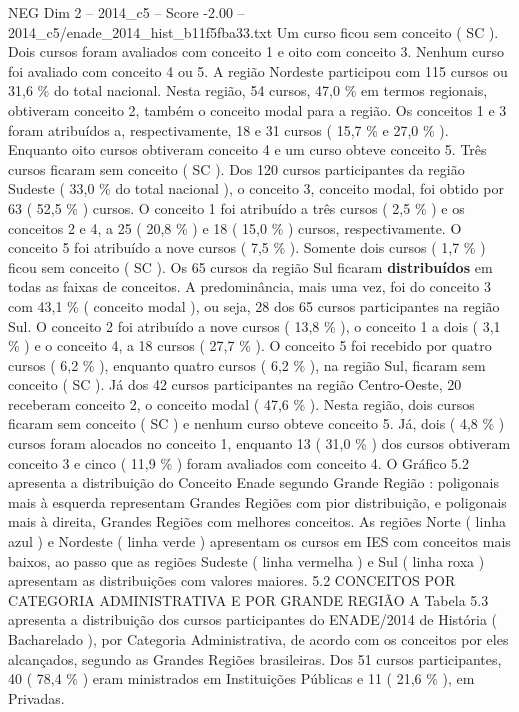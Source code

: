 \begin{textsample}{NEG Dim 2 – 2014\_c5 – Score -2.00 – 2014\_c5/enade\_2014\_hist\_b11f5fba33.txt}
Um curso ficou sem conceito ( SC ).
Dois cursos foram avaliados com conceito 1 e oito com conceito 3.
Nenhum curso foi avaliado com conceito 4 ou 5.
A região Nordeste participou com 115 cursos ou 31,6 \% do total nacional.
Nesta região, 54 cursos, 47,0 \% em termos regionais, obtiveram conceito 2, também o conceito modal para a região.
Os conceitos 1 e 3 foram atribuídos a, respectivamente, 18 e 31 cursos ( 15,7 \% e 27,0 \% ).
Enquanto oito cursos obtiveram conceito 4 e um curso obteve conceito 5.
Três cursos ficaram sem conceito ( SC ).
Dos 120 cursos participantes da região Sudeste ( 33,0 \% do total nacional ), o conceito 3, conceito modal, foi obtido por 63 ( 52,5 \% ) cursos.
O conceito 1 foi atribuído a três cursos ( 2,5 \% ) e os conceitos 2 e 4, a 25 ( 20,8 \% ) e 18 ( 15,0 \% ) cursos, respectivamente.
O conceito 5 foi atribuído a nove cursos ( 7,5 \% ).
Somente dois cursos ( 1,7 \% ) ficou sem conceito ( SC ).
Os 65 cursos da região Sul ficaram \textbf{distribuídos} em todas as faixas de conceitos.
A predominância, mais uma vez, foi do conceito 3 com 43,1 \% ( conceito modal ), ou seja, 28 dos 65 cursos participantes na região Sul.
O conceito 2 foi atribuído a nove cursos ( 13,8 \% ), o conceito 1 a dois ( 3,1 \% ) e o conceito 4, a 18 cursos ( 27,7 \% ).
O conceito 5 foi recebido por quatro cursos ( 6,2 \% ), enquanto quatro cursos ( 6,2 \% ), na região Sul, ficaram sem conceito ( SC ).
Já dos 42 cursos participantes na região Centro-Oeste, 20 receberam conceito 2, o conceito modal ( 47,6 \% ).
Nesta região, dois cursos ficaram sem conceito ( SC ) e nenhum curso obteve conceito 5.
Já, dois ( 4,8 \% ) cursos foram alocados no conceito 1, enquanto 13 ( 31,0 \% ) dos cursos obtiveram conceito 3 e cinco ( 11,9 \% ) foram avaliados com conceito 4.
O Gráfico 5.2 apresenta a distribuição do Conceito Enade segundo Grande Região : poligonais mais à esquerda representam Grandes Regiões com pior distribuição, e poligonais mais à direita, Grandes Regiões com melhores conceitos.
As regiões Norte ( linha azul ) e Nordeste ( linha verde ) apresentam os cursos em IES com conceitos mais baixos, ao passo que as regiões Sudeste ( linha vermelha ) e Sul ( linha roxa ) apresentam as distribuições com valores maiores. 5.2 CONCEITOS POR CATEGORIA ADMINISTRATIVA E POR GRANDE REGIÃO A Tabela 5.3 apresenta a distribuição dos cursos participantes do ENADE/2014 de História ( Bacharelado ), por Categoria Administrativa, de acordo com os conceitos por eles alcançados, segundo as Grandes Regiões brasileiras.
Dos 51 cursos participantes, 40 ( 78,4 \% ) eram ministrados em Instituições Públicas e 11 ( 21,6 \% ), em Privadas.

\end{textsample}
